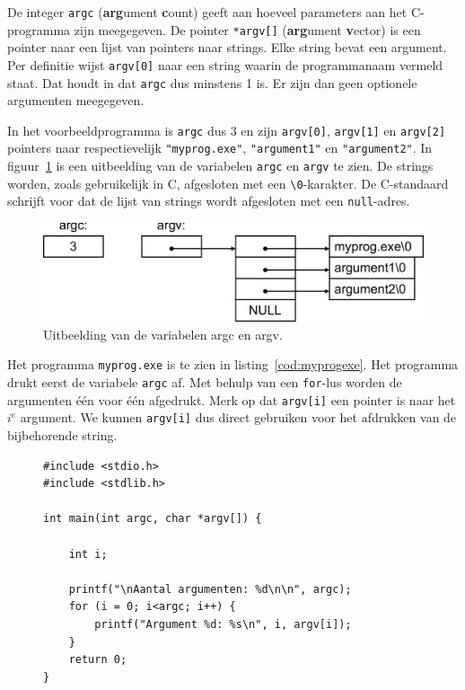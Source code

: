 \documentclass[a4paper,12pt,twoside]{article}
\begin{document}
De integer \lstinline|argc| (\textbf{arg}ument \textbf{c}ount) geeft aan hoeveel
parameters aan het C-programma zijn meegegeven. De pointer \lstinline|*argv[]|
(\textbf{arg}ument \textbf{v}ector) is  een pointer naar een lijst van pointers
naar strings. Elke string bevat een argument. Per definitie wijst \lstinline|argv[0]|
naar een string waarin de programmanaam vermeld staat. Dat houdt in dat \lstinline|argc| dus minstens 1 is.
Er zijn dan geen optionele argumenten meegegeven.

In het voorbeeldprogramma is \lstinline|argc| dus 3 en zijn
\lstinline|argv[0]|, \lstinline|argv[1]| en \lstinline|argv[2]| pointers naar respectievelijk
\lstinline|"myprog.exe"|, \lstinline|"argument1"| en \lstinline|"argument2"|. In
figuur~\ref{fig:argcargv} is een uitbeelding van de variabelen \lstinline|argc|
en \lstinline|argv| te zien. De strings worden, zoals gebruikelijk in C, afgesloten
met een \lstinline|\0|-karakter. De C-standaard schrijft voor dat de lijst van strings
wordt afgesloten met een \lstinline|null|-adres.

\begin{figure}[!ht]
\centering
\includegraphics[scale=0.55]{argcargv.pdf}
\caption{Uitbeelding van de variabelen argc en argv.}
\label{fig:argcargv}
\end{figure}

Het programma \lstinline|myprog.exe| is te zien in listing~\ref{cod:myprogexe}. Het
programma drukt eerst de variabele \lstinline|argc| af. Met behulp van een \lstinline|for|-lus
worden de argumenten \'e\'en voor \'e\'en afgedrukt. Merk op dat \lstinline|argv[i]| een
pointer is naar het $i^e$ argument. We kunnen \lstinline|argv[i]| dus direct gebruiken
voor het afdrukken van de bijbehorende string.

\begin{figure}[H]
\begin{lstlisting}[caption=Het programma myprog.exe.,label=cod:myprogexe]
#include <stdio.h>
#include <stdlib.h>

int main(int argc, char *argv[]) {

    int i;

    printf("\nAantal argumenten: %d\n\n", argc);
    for (i = 0; i<argc; i++) {
        printf("Argument %d: %s\n", i, argv[i]);
    }
    return 0;
}
\end{lstlisting}
\end{figure}
\end{document}
